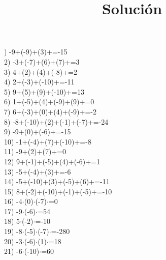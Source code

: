 \documentclass[a4paper,10pt]{article}
\title{Solución}
\author{}
\date{}
\begin{document}
)   -9+(-9)+(3)+=-15
\vspace{0.5cm}\\2)   -3+(-7)+(6)+(7)+=3
\vspace{0.5cm}\\3)   4+(2)+(4)+(-8)+=2
\vspace{0.5cm}\\4)   2+(-3)+(-10)+=-11
\vspace{0.5cm}\\5)   9+(5)+(9)+(-10)+=13
\vspace{0.5cm}\\6)   1+(-5)+(4)+(-9)+(9)+=0
\vspace{0.5cm}\\7)   6+(-3)+(0)+(4)+(-9)+=-2
\vspace{0.5cm}\\8)   -8+(-10)+(2)+(-1)+(-7)+=-24
\vspace{0.5cm}\\9)   -9+(0)+(-6)+=-15
\vspace{0.5cm}\\10)   -1+(-4)+(7)+(-10)+=-8
\vspace{0.5cm}\\11)   -9+(2)+(7)+=0
\vspace{0.5cm}\\12)   9+(-1)+(-5)+(4)+(-6)+=1
\vspace{0.5cm}\\13)   -5+(-4)+(3)+=-6
\vspace{0.5cm}\\14)   -5+(-10)+(3)+(-5)+(6)+=-11
\vspace{0.5cm}\\15)   8+(-2)+(-10)+(-1)+(-5)+=-10
\vspace{0.5cm}\\16)   -4$\cdot$(0)$\cdot$(-7)$\cdot$=0
\vspace{0.5cm}\\17)   -9$\cdot$(-6)$\cdot$=54
\vspace{0.5cm}\\18)   5$\cdot$(-2)$\cdot$=-10
\vspace{0.5cm}\\19)   -8$\cdot$(-5)$\cdot$(-7)$\cdot$=-280
\vspace{0.5cm}\\20)   -3$\cdot$(-6)$\cdot$(1)$\cdot$=18
\vspace{0.5cm}\\21)   -6$\cdot$(-10)$\cdot$=60
\end{document}
